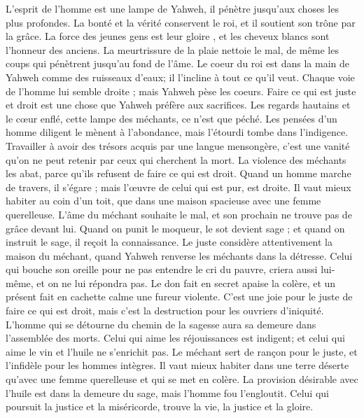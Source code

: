 \begin{multicols}{2}
L'esprit de l'homme est une lampe de Yahweh, il pénètre jusqu'aux choses les plus profondes.
La bonté et la vérité conservent le roi, et il soutient son trône par la grâce.
La force des jeunes gens est leur gloire , et les cheveux blancs sont l'honneur des anciens.
La meurtrissure de la plaie nettoie le mal, de même les coups qui pénètrent jusqu'au fond de l'âme.
\VerseOne{}Le coeur du roi est dans la main de Yahweh comme des ruisseaux d'eaux; il l'incline à tout ce qu'il veut.
Chaque voie de l'homme lui semble droite ; mais Yahweh pèse les coeurs.
Faire ce qui est juste et droit est une chose que Yahweh préfère aux sacrifices.
Les regards hautains et le cœur enflé, cette lampe des méchants, ce n'est que péché.
Les pensées d'un homme diligent le mènent à l'abondance, mais l'étourdi tombe dans l'indigence.
Travailler à avoir des trésors acquis par une langue mensongère, c'est une vanité qu'on ne peut retenir par ceux qui cherchent la mort.
La violence des méchants les abat, parce qu'ils refusent de faire ce qui est droit.
Quand un homme marche de travers, il s'égare ; mais l'œuvre de celui qui est pur, est droite.
Il vaut mieux habiter au coin d'un toit, que dans une maison spacieuse avec une femme querelleuse.
L'âme du méchant souhaite le mal, et son prochain ne trouve pas de grâce devant lui.
Quand on punit le moqueur, le sot devient sage ; et quand on instruit le sage, il reçoit la connaissance.
Le juste considère attentivement la maison du méchant, quand Yahweh renverse les méchants dans la détresse.
Celui qui bouche son oreille pour ne pas entendre le cri du pauvre, criera aussi lui-même, et on ne lui répondra pas.
Le don fait en secret apaise la colère, et un présent fait en cachette calme une fureur violente.
C'est une joie pour le juste de faire ce qui est droit, mais c'est la destruction pour les ouvriers d'iniquité.
L'homme qui se détourne du chemin de la sagesse aura sa demeure dans l'assemblée des morts.
Celui qui aime les réjouissances est indigent; et celui qui aime le vin et l'huile ne s'enrichit pas.
Le méchant sert de rançon pour le juste, et l'infidèle pour les hommes intègres.
Il vaut mieux habiter dans une terre déserte qu'avec une femme querelleuse et qui se met en colère.
La provision désirable avec l'huile est dans la demeure du sage, mais l'homme fou l'engloutit.
Celui qui poursuit la justice et la miséricorde, trouve la vie, la justice et la gloire.

\end{multicols}
